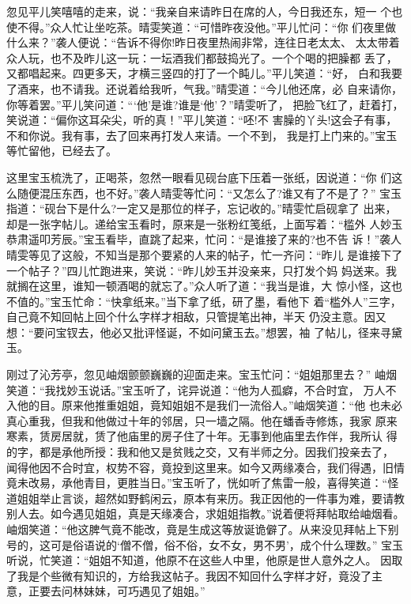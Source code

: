 忽见平儿笑嘻嘻的走来，说：“我亲自来请昨日在席的人，今日我还东，短一
个也使不得。”众人忙让坐吃茶。晴雯笑道：“可惜昨夜没他。”平儿忙问：“你
们夜里做什么来？”袭人便说：“告诉不得你!昨日夜里热闹非常，连往日老太太、
太太带着众人玩，也不及昨儿这一玩：一坛酒我们都鼓捣光了。一个个喝的把臊都
丢了，又都唱起来。四更多天，才横三竖四的打了一个盹儿。”平儿笑道：“好，
白和我要了酒来，也不请我。还说着给我听，气我。”晴雯道：“今儿他还席，必
自来请你，你等着罢。”平儿笑问道：“‘他’是谁?谁是‘他’？”晴雯听了，
把脸飞红了，赶着打，笑说道：“偏你这耳朵尖，听的真！”平儿笑道：“呸!不
害臊的丫头!这会子有事，不和你说。我有事，去了回来再打发人来请。一个不到，
我是打上门来的。”宝玉等忙留他，已经去了。

这里宝玉梳洗了，正喝茶，忽然一眼看见砚台底下压着一张纸，因说道：“你
们这么随便混压东西，也不好。”袭人晴雯等忙问：“又怎么了?谁又有了不是了？”
宝玉指道：“砚台下是什么?一定又是那位的样子，忘记收的。”晴雯忙启砚拿了
出来，却是一张字帖儿。递给宝玉看时，原来是一张粉红笺纸，上面写着：“槛外
人妙玉恭肃遥叩芳辰。”宝玉看毕，直跳了起来，忙问：“是谁接了来的?也不告
诉！”袭人晴雯等见了这般，不知当是那个要紧的人来的帖子，忙一齐问：“昨儿
是谁接下了一个帖子？”四儿忙跑进来，笑说：“昨儿妙玉并没亲来，只打发个妈
妈送来。我就搁在这里，谁知一顿酒喝的就忘了。”众人听了道：“我当是谁，大
惊小怪，这也不值的。”宝玉忙命：“快拿纸来。”当下拿了纸，研了墨，看他下
着“槛外人”三字，自己竟不知回帖上回个什么字样才相敌，只管提笔出神，半天
仍没主意。因又想：“要问宝钗去，他必又批评怪诞，不如问黛玉去。”想罢，袖
了帖儿，径来寻黛玉。

刚过了沁芳亭，忽见岫烟颤颤巍巍的迎面走来。宝玉忙问：“姐姐那里去？”
岫烟笑道：“我找妙玉说话。”宝玉听了，诧异说道：“他为人孤癖，不合时宜，
万人不入他的目。原来他推重姐姐，竟知姐姐不是我们一流俗人。”岫烟笑道：“他
也未必真心重我，但我和他做过十年的邻居，只一墙之隔。他在蟠香寺修炼，我家
原来寒素，赁房居就，赁了他庙里的房子住了十年。无事到他庙里去作伴，我所认
得的字，都是承他所授：我和他又是贫贱之交，又有半师之分。因我们投亲去了，
闻得他因不合时宜，权势不容，竟投到这里来。如今又两缘凑合，我们得遇，旧情
竟未改易，承他青目，更胜当日。”宝玉听了，恍如听了焦雷一般，喜得笑道：“怪
道姐姐举止言谈，超然如野鹤闲云，原本有来历。我正因他的一件事为难，要请教
别人去。如今遇见姐姐，真是天缘凑合，求姐姐指教。”说着便将拜帖取给岫烟看。
岫烟笑道：“他这脾气竟不能改，竟是生成这等放诞诡僻了。从来没见拜帖上下别
号的，这可是俗语说的‘僧不僧，俗不俗，女不女，男不男’，成个什么理数。”
宝玉听说，忙笑道：“姐姐不知道，他原不在这些人中里，他原是世人意外之人。
因取了我是个些微有知识的，方给我这帖子。我因不知回什么字样才好，竟没了主
意，正要去问林妹妹，可巧遇见了姐姐。”

